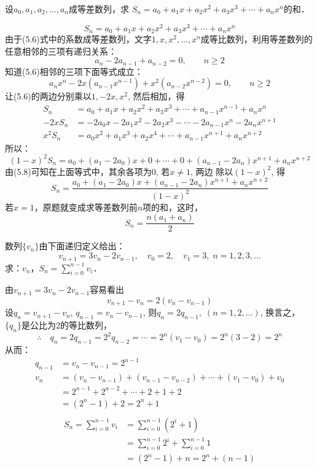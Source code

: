 \begin{example}
设$a_0,a_1,a_2,\ldots,a_n$成等差数列，求
$S_n=a_0+a_1x+a_2x^2+a_3x^3+\cdots+a_nx^n$的和．    
\end{example}

\begin{solution}
    \begin{equation}
        S_n=a_0+a_1x+a_2x^2+a_3x^3+\cdots+a_nx^n
    \end{equation}
由于(5.6)式中的系数成等差数列，文字$1,x,x^2,\ldots,x^n$成等比数列，利用等差数列的任意相邻的三项有递归关系：
\begin{equation}
    a_n-2a_{n-1}+a_{n-2}=0,\qquad n\ge 2
\end{equation}
知道(5.6)相邻的三项下面等式成立：
\begin{equation}
    a_nx^n-2x(a_{n-1}x^{n-1})+x^2(a_{n-2}x^{n-2})=0,\qquad n\ge 2
\end{equation}
让(5.6)的两边分别乘以$1,-2x,x^2$, 然后相加，得
\[\begin{split}
    S_n&=a_0+a_1x+a_2x^2+a_3x^3+\cdots+a_{n-1}x^{n-1}+a_nx^n\\
    -2xS_n&=-2a_0x-2a_1x^2-2a_2x^3-\cdots-2a_{n-1}x^n-2a_nx^{n+1}\\
    x^2S_n&=a_0x^2+a_1x^3+a_2x^4+\cdots+a_{n-1}x^{n+1}+a_nx^{n+2}
\end{split}\]
所以：
\[(1-x)^2 S_n=a_0+(a_1-2a_0)x+0+\cdots+0+(a_{n-1}-2a_n)x^{n+1}+a_nx^{n+2}\]
由(5.8)可知在上面等式中，其余各项为0, 若$x\ne1$, 两边
除以$(1-x)^2$, 得
\[S_n=\frac{a_0+(a_1-2a_0)x+(a_{n-1}-2a_n)x^{n+1}+a_nx^{n+2}}{(1-x)^2}\]
若$x=1$，原题就变成求等差数列前$n$项的和，这时，
\[S_n=\frac{n(a_1+a_n)}{2}\]
\end{solution}

\begin{example}
    数列$\{v_n\}$由下面递归定义给出：
 \[   v_{n+1}=3v_n-2v_{n-1},\quad v_0=2,\quad v_1=3,\; n=1,2,3,\ldots\]
 求：$v_n$，$S_n=\sum^{n-1}_{i=0}v_i$．
\end{example}

\begin{solution}
    由$v_{n+1}=3v_n-2v_{n-1}$容易看出
  \[  v_{n+1}-v_{n}=2(v_n-v_{n-1})\]
    设$q_n=v_{n+1}-v_n$, $q_{n-1}=v_n-v_{n-1}$, 则$q_n=2q_{n-1},\; (n=1,2,\ldots)$, 换言之，$\{q_n\}$是公比为2的等比数列，
\[\therefore\quad q_n=2q_{n-1}=2^2q_{n-2}=\cdots=2^n(v_1-v_0)=2^n(3-2)=2^n\]
从而：
\[\begin{split}
    q_{n-1}&=v_n-v_{n-1}=2^{n-1}\\
v_n&=(v_n-v_{n-1})+(v_{n-1}-v_{n-2})+\cdots+(v_1-v_0)+v_0\\
&=2^{n-1}+2^{n-2}+\cdots +2+1+2\\
&=(2^n-1)+2=2^n+1\\
\end{split}\]
\[\begin{split}
    S_n=\sum^{n-1}_{i=0}v_i&=\sum^{n-1}_{i=0}(2^i+1)\\
    &=\sum^{n-1}_{i=0}2^i+\sum^{n-1}_{i=0}1\\
    &=(2^n-1)+n=2^n+(n-1)
\end{split}\]
\end{solution}

